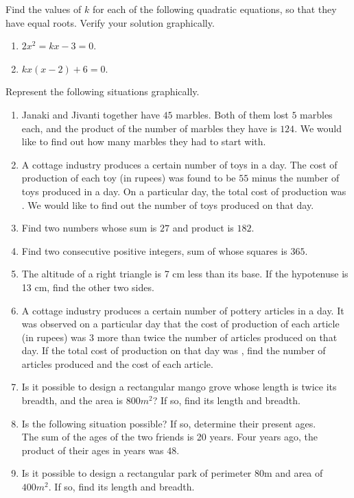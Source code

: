 Find the values of $k$ for each of the following quadratic equations, so that they have equal roots.  Verify your solution graphically.
\begin{enumerate}[label=\thesubsection.\arabic*,ref=\thesubsection.\theenumi,resume*]
\item $2x^2=kx-3=0$.
\item $kx(x-2)+6=0$.
\end{enumerate}
Represent the following situations graphically.
\begin{enumerate}[label=\thesubsection.\arabic*,ref=\thesubsection.\theenumi,resume*]
\item Janaki and Jivanti together have $45$ marbles. Both of them lost $5$ marbles each, and the product of the number of marbles they have is $124$. We would like to find out how many marbles they had to start with.
\item A cottage industry produces a certain number of toys in a day. The cost of production of each toy (in rupees) was found to be $55$ minus the number of toys produced in a day. On a particular day, the total cost of production was . We would like to find out the number of toys produced on that day.
\item Find two numbers whose sum is $27$ and product is $182$.
\item Find two consecutive  positive integers, sum of whose squares is $365$.
\item  The altitude of a right triangle is 7 cm less than its base. If the hypotenuse is 13 cm, find the other two sides.
	\\
		\solution
		
\item A cottage industry produces a certain number of pottery articles in a day. It was observed on a particular day that the cost of production of each article (in rupees) was $3$ more than twice the number of articles produced on that day. If the total cost of production on that day was , find the number of articles produced and the cost of each article.
\item Is it possible to design a rectangular mango grove whose length is twice its breadth, and the area is  $800m^2$? If so, find its length and breadth.
\item Is the following situation possible? If so, determine their present ages.
\\ The sum of the ages of the two friends is 20 years. Four years ago, the product of their ages in years was $48$.
\item Is it possible to design a rectangular park of perimeter 80m and area of $400m^2$. If so, find its length and breadth.

\end{enumerate}

